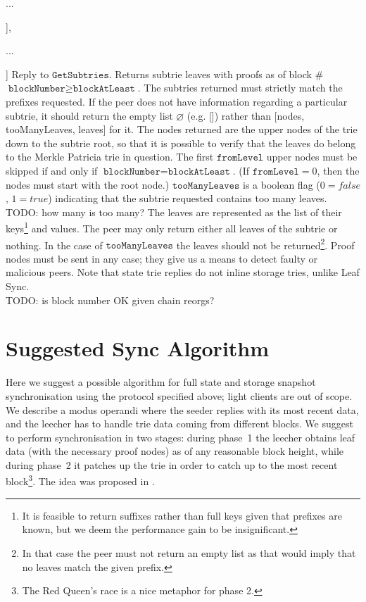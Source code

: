 \documentclass{amsart}
\begin{document}
\qquad ...

\quad ],

\quad ...

] Reply to $\texttt{GetSubtries}$.
Returns subtrie leaves with proofs as of block \#$\texttt{blockNumber} \geq \texttt{blockAtLeast}$.
The subtries returned must strictly match the prefixes requested.
If the peer does not have information regarding a particular subtrie, it should return the empty list $\varnothing$ (e.g. []) rather than [nodes, tooManyLeaves, leaves] for it.
The nodes returned are the upper nodes of the trie down to the subtrie root, so that it is possible to verify that the leaves do belong to the Merkle Patricia trie in question.
The first $\texttt{fromLevel}$ upper nodes must be skipped if and only if $\texttt{blockNumber} = \texttt{blockAtLeast}$.
(If $\texttt{fromLevel} = 0$, then the nodes must start with the root node.)
$\texttt{tooManyLeaves}$ is a boolean flag ($0=false$, $1=true$) indicating that the subtrie requested contains too many leaves.
TODO: how many is too many?
The leaves are represented as the list of their keys\footnote{It
is feasible to return suffixes rather than full keys given that prefixes are known, but we deem the performance gain to be insignificant.}
and values.
The peer may only return either all leaves of the subtrie or nothing.
In the case of $\texttt{tooManyLeaves}$ the leaves should not be returned\footnote{In
that case the peer must not return an empty list as that would imply that no leaves match the given prefix.}.
Proof nodes must be sent in any case;
they give us a means to detect faulty or malicious peers.
Note that state trie replies do not inline storage tries, unlike Leaf Sync.\\

TODO: is block number OK given chain reorgs?

\section{Suggested Sync Algorithm}

Here we suggest a possible algorithm for full state and storage snapshot synchronisation using the protocol specified above;
light clients are out of scope.
We describe a modus operandi where the seeder replies with its most recent data,
and the leecher has to handle trie data coming from different blocks.
We suggest to perform synchronisation in two stages:
during phase~1 the leecher obtains leaf data (with the necessary proof nodes) as of any reasonable block height,
while during phase~2 it patches up the trie in order to catch up to the most recent block\footnote{The
Red Queen's race is a nice metaphor for phase 2.}.
The idea was proposed in \cite{leaf_sync}.
\end{document}
